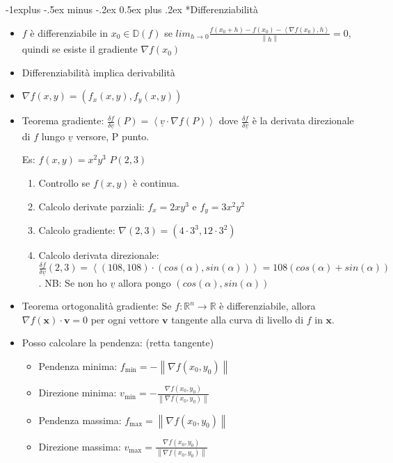 \documentclass[10pt,landscape, a4paper]{article}
\makeatletter
\renewcommand{\subsection}{\@startsection{subsection}{2}{0mm}%
                                {-1explus -.5ex minus -.2ex}%
                                {0.5ex plus .2ex}%
                                {\normalfont\normalsize\bfseries}}
\makeatother
\begin{document}
\begin{multicols}{3}
\subsection*{Differenziabilità}
\begin{itemize}
	\item $f$ è differenziabile in $x_0 \in \mathbb{D}(f)$ se $lim_{h \to 0} \frac{f(x_0+h)-f(x_0)-\left\langle \nabla f(x_0), h \right\rangle}{\left\lVert h \right\rVert} = 0$, quindi se esiste il gradiente $\nabla f(x_0)$
	\item Differenziabilità implica derivabilità
	\item $\nabla f(x,y) = (f_x(x,y), f_y(x,y))$
	\item Teorema gradiente: $\frac{\delta f}{\delta \underline{v}}(P) = \left\langle \underline{v}\cdot\nabla f(P)  \right\rangle$ dove $\frac{\delta f}{\delta \underline{v}}$ è la derivata direzionale di $f$ lungo $\underline{v}$ versore, P punto.

		Es: $f(x,y) = x^2 y^3$ $P(2,3)$
		\begin{enumerate}
			\item Controllo se $f(x,y)$ è continua.
			\item Calcolo derivate parziali: $f_x = 2xy^3$ e $f_y = 3x^2y^2$
			\item Calcolo gradiente: $\nabla (2,3) = (4\cdot 3^3, 12 \cdot 3^2)$
			\item Calcolo derivata direzionale: $\frac{\delta f}{\delta \underline{v}}(2,3) = \left\langle \left(108,108\right)\cdot \left(cos(\alpha), sin(\alpha)\right)\right\rangle = 108(cos(\alpha)+sin(\alpha))$. NB: Se non ho $\underline{v}$ allora pongo $(cos(\alpha), sin(\alpha))$
		\end{enumerate}
	\item Teorema ortogonalità gradiente: Se $f : \mathbb{R}^n \to \mathbb{R}$ è differenziabile, allora $\nabla f(\mathbf{x}) \cdot \mathbf{v} = 0$ per ogni vettore $\mathbf{v}$ tangente alla curva di livello di $f$ in $\mathbf{x}$.
	\item Posso calcolare la pendenza: (retta tangente)
		\begin{itemize}
			\item Pendenza minima: $f_{\min} = -\left\lVert \nabla f(x_0,y_0) \right\rVert$
			\item Direzione minima: $v_{\min} = -\frac{\nabla f(x_0,y_0)}{\left\lVert \nabla f(x_0,y_0) \right\rVert}$
			\item Pendenza massima: $f_{\max} = \left\lVert \nabla f(x_0,y_0) \right\rVert$
			\item Direzione massima: $v_{\max} = \frac{\nabla f(x_0,y_0)}{\left\lVert \nabla f(x_0,y_0) \right\rVert}$
		\end{itemize}
\end{itemize}


\end{multicols}
\end{document}
